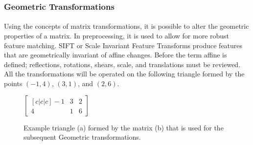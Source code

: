 \documentclass[11pt]{article}
\newcommand\simpleparagraph[1]{%
	\stepcounter{paragraph}\paragraph*{\theparagraph\quad{}#1}}
\renewcommand\theparagraph{}
\begin{document}
\subsubsection{Geometric Transformations}
\simpleparagraph{}
Using the concepts of matrix transformations, it is possible to alter the geometric properties of a matrix. In preprocessing, it is used to allow for more robust feature matching. SIFT or Scale Invariant Feature Transforms \cite{lowe_distinctive_2004} produce features that are geometrically invariant of affine changes. Before the term affine is defined; reflections, rotations, shears, scale, and translations must be reviewed. All the transformations will be operated on the following triangle formed by the points $(-1, 4)$, $(3, 1)$, and $(2, 6)$.
\begin{figure}[h]
	\centering
	\begin{minipage}[Cartesian Form]{0.5\textwidth}
	\end{minipage}
	\hfill
	\begin{minipage}[Matrix Form]{0.4\textwidth}
		\centering
		{\large
			$\begin{bmatrix}[c|c|c]
				-1 & 3 & 2\\
				4 & 1 & 6
			\end{bmatrix}$
		}
	\end{minipage}
	\hfill
	\caption{Example triangle (a) formed by the matrix (b) that is used for the subsequent Geometric transformations.}
	\label{fig:Triangle}
\end{figure}
\end{document}
